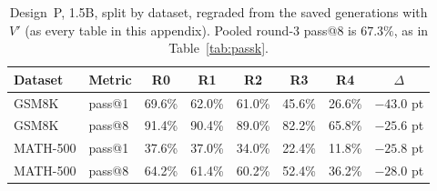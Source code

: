 \documentclass[runningheads]{llncs}
\begin{document}
\begin{table}[t]
\caption{Design~P, 1.5B, split by dataset, regraded from the saved
generations with $V'$ (as every table in this appendix). Pooled round-3 pass@8 is $67.3\%$, as in Table~\ref{tab:passk}.}
\label{tab:bydataset}
\centering
\begin{tabular}{llccccc c}
\toprule
Dataset & Metric & R0 & R1 & R2 & R3 & R4 & $\Delta$ \\
\midrule
GSM8K & pass@1 & 69.6\% & 62.0\% & 61.0\% & 45.6\% & 26.6\% & $-43.0$ pt \\
GSM8K & pass@8 & 91.4\% & 90.4\% & 89.0\% & 82.2\% & 65.8\% & $-25.6$ pt \\
MATH-500 & pass@1 & 37.6\% & 37.0\% & 34.0\% & 22.4\% & 11.8\% & $-25.8$ pt \\
MATH-500 & pass@8 & 64.2\% & 61.4\% & 60.2\% & 52.4\% & 36.2\% & $-28.0$ pt \\
\bottomrule
\end{tabular}
\end{table}
\end{document}
